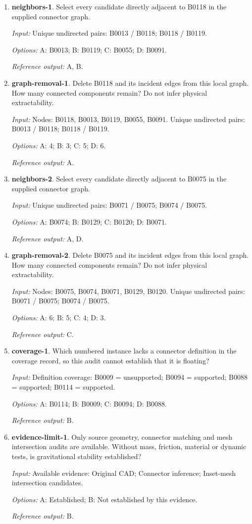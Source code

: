\begin{enumerate}
\item \textbf{neighbors-1}. Select every candidate directly adjacent to B0118 in the supplied connector graph.\par {\small \textit{Input:} Unique undirected pairs: B0013 / B0118; B0118 / B0119. \par\textit{Options:} A: B0013; B: B0119; C: B0055; D: B0091. \par\textit{Reference output:} A, B.}
\item \textbf{graph-removal-1}. Delete B0118 and its incident edges from this local graph. How many connected components remain? Do not infer physical extractability.\par {\small \textit{Input:} Nodes: B0118, B0013, B0119, B0055, B0091. Unique undirected pairs: B0013 / B0118; B0118 / B0119. \par\textit{Options:} A: 4; B: 3; C: 5; D: 6. \par\textit{Reference output:} A.}
\item \textbf{neighbors-2}. Select every candidate directly adjacent to B0075 in the supplied connector graph.\par {\small \textit{Input:} Unique undirected pairs: B0071 / B0075; B0074 / B0075. \par\textit{Options:} A: B0074; B: B0129; C: B0120; D: B0071. \par\textit{Reference output:} A, D.}
\item \textbf{graph-removal-2}. Delete B0075 and its incident edges from this local graph. How many connected components remain? Do not infer physical extractability.\par {\small \textit{Input:} Nodes: B0075, B0074, B0071, B0129, B0120. Unique undirected pairs: B0071 / B0075; B0074 / B0075. \par\textit{Options:} A: 6; B: 5; C: 4; D: 3. \par\textit{Reference output:} C.}
\item \textbf{coverage-1}. Which numbered instance lacks a connector definition in the coverage record, so this audit cannot establish that it is floating?\par {\small \textit{Input:} Definition coverage: B0009 = unsupported; B0094 = supported; B0088 = supported; B0114 = supported. \par\textit{Options:} A: B0114; B: B0009; C: B0094; D: B0088. \par\textit{Reference output:} B.}
\item \textbf{evidence-limit-1}. Only source geometry, connector matching and mesh intersection audits are available. Without mass, friction, material or dynamic tests, is gravitational stability established?\par {\small \textit{Input:} Available evidence: Original CAD; Connector inference; Inset-mesh intersection candidates. \par\textit{Options:} A: Established; B: Not established by this evidence. \par\textit{Reference output:} B.}

\end{enumerate}
